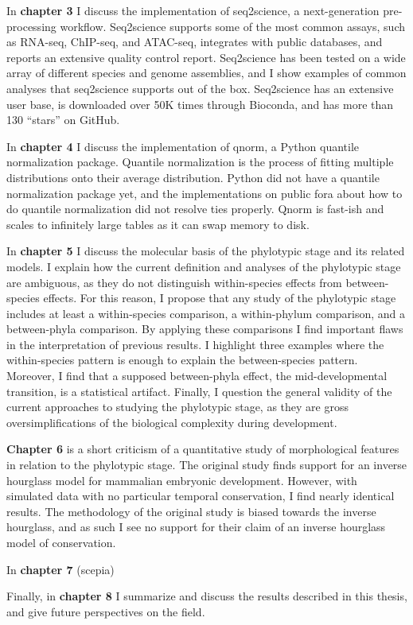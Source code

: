In \textbf{chapter 3} I discuss the implementation of seq2science, a next-generation pre-processing workflow. Seq2science supports some of the most common assays, such as RNA-seq, ChIP-seq, and ATAC-seq, integrates with public databases, and reports an extensive quality control report. Seq2science has been tested on a wide array of different species and genome assemblies, and I show examples of common analyses that seq2science supports out of the box. Seq2science has an extensive user base\cite{Bright_2021,Xu_2020,Wester2021,SantosBarriopedro2021,Heuts2023,Tholen2023,Harlaar2022,LunaVelez2023,Neikes2023,Vierboom2021,Smits2020,Smits2022,Heuts2022,Rother2023,Ho2023,Sweep2023}, is downloaded over 50K times through Bioconda, and has more than 130 ``stars'' on GitHub.

In \textbf{chapter 4} I discuss the implementation of qnorm, a Python quantile normalization package. Quantile normalization is the process of fitting multiple distributions onto their average distribution. Python did not have a quantile normalization package yet, and the implementations on public fora about how to do quantile normalization did not resolve ties properly. Qnorm is fast-ish and scales to infinitely large tables as it can swap memory to disk.

In \textbf{chapter 5} I discuss the molecular basis of the phylotypic stage and its related models. I explain how the current definition and analyses of the phylotypic stage are ambiguous, as they do not distinguish within-species effects from between-species effects. For this reason, I propose that any study of the phylotypic stage includes at least a within-species comparison, a within-phylum comparison, and a between-phyla comparison. By applying these comparisons I find important flaws in the interpretation of previous results. I highlight three examples where the within-species pattern is enough to explain the between-species pattern. Moreover, I find that a supposed between-phyla effect, the mid-developmental transition, is a statistical artifact. Finally, I question the general validity of the current approaches to studying the phylotypic stage, as they are gross oversimplifications of the biological complexity during development.

\textbf{Chapter 6} is a short criticism of a quantitative study of morphological features in relation to the phylotypic stage. The original study finds support for an inverse hourglass model for mammalian embryonic development. However, with simulated data with no particular temporal conservation, I find nearly identical results. The methodology of the original study is biased towards the inverse hourglass, and as such I see no support for their claim of an inverse hourglass model of conservation.

In \textbf{chapter 7} (scepia)

Finally, in \textbf{chapter 8} I summarize and discuss the results described in this thesis, and give future perspectives on the field.
